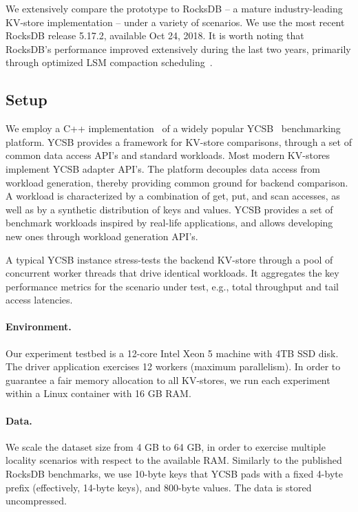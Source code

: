 We extensively compare the \sys\/ prototype to RocksDB -- a mature industry-leading KV-store implementation  -- under a variety of scenarios.  We use the most recent RocksDB release 5.17.2, available Oct 24, 2018.  
It is worth noting that RocksDB's performance improved extensively during the last two years, primarily through 
optimized LSM compaction scheduling~\cite{RocksDBProgress}.   

\subsection{Setup}
We employ a C++ implementation~\cite{Cpp-YCSB} of a widely popular YCSB~\cite{Cooper:2010:BCS:1807128.1807152} 
benchmarking platform. 
YCSB provides a framework for KV-store comparisons, through a set of common data access API's and standard workloads. 
Most modern KV-stores implement  YCSB adapter API's. The platform decouples data access from workload generation, 
thereby providing common ground for backend comparison. A workload is characterized by a combination of get, put, 
and scan accesses, as well as by a synthetic distribution of keys and values. YCSB provides a set of benchmark workloads
inspired by real-life applications, and allows developing new ones through workload generation API's. 

A typical YCSB instance stress-tests the backend KV-store through a pool of concurrent worker threads that drive identical
workloads. It aggregates the key performance metrics for the scenario under test, e.g., total throughput and tail access latencies. 

\paragraph{Environment.}
Our experiment testbed is a 12-core Intel Xeon 5 machine with 4TB SSD disk. The driver application exercises 12 workers 
(maximum parallelism). In order to guarantee a fair memory allocation to all KV-stores, we run each experiment within 
a Linux container with 16 GB RAM. 

\paragraph{Data.} We scale the dataset size from 4 GB to 64 GB, in order to exercise multiple locality 
scenarios with respect to the available RAM. Similarly to the published RocksDB benchmarks, we use 
10-byte keys that YCSB pads with a fixed 4-byte prefix (effectively, 14-byte keys), and 800-byte values. 
The data is stored uncompressed. 

